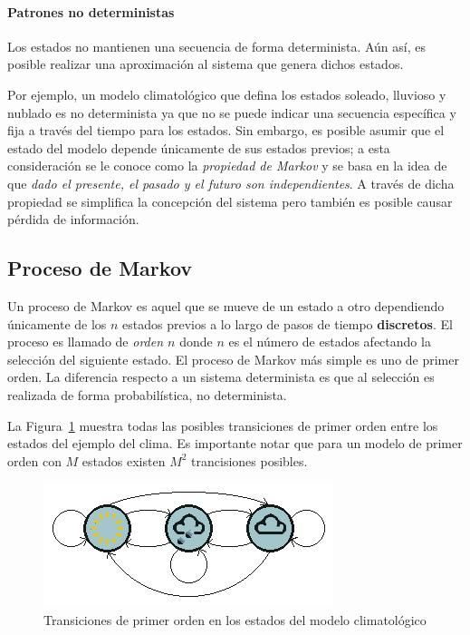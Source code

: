 \documentclass{article}
\begin{document}
\paragraph{Patrones no deterministas}
\label{par:patrones_no_deterministas}
Los estados no mantienen una secuencia de forma determinista.
Aún así, es posible realizar una aproximación al sistema que genera dichos estados.

Por ejemplo, un modelo climatológico que defina los estados soleado, lluvioso y nublado es no determinista ya que no se puede indicar una secuencia específica y fija a través del tiempo para los estados.
Sin embargo, es posible asumir que el estado del modelo depende únicamente de sus estados previos; a esta consideración se le conoce como la \emph{propiedad de Markov} y se basa en la idea de que \emph{dado el presente, el pasado y el futuro son independientes}.
A través de dicha propiedad se simplifica la concepción del sistema pero también es posible causar pérdida de información.

\subsection{Proceso de Markov}
\label{sub:proceso_de_markov}
Un proceso de Markov es aquel que se mueve de un estado a otro dependiendo únicamente de los $n$ estados previos a lo largo de pasos de tiempo \textbf{discretos}.
El proceso es llamado de \emph{orden $n$} donde $n$ es el número de estados afectando la selección del siguiente estado.
El proceso de Markov más simple es uno de primer orden.
La diferencia respecto a un sistema determinista es que al selección es realizada de forma probabilística, no determinista.

La Figura~\ref{fig:transiciones-clima} muestra todas las posibles transiciones de primer orden entre los estados del ejemplo del clima.
Es importante notar que para un modelo de primer orden con $M$ estados existen $M^2$ trancisiones posibles.
\begin{figure}[h]
	\centering
	\includegraphics[scale=0.75]{resources/images/weather-example}
	\caption{Transiciones de primer orden en los estados del modelo climatológico}
	\label{fig:transiciones-clima}
\end{figure}
\end{document}
